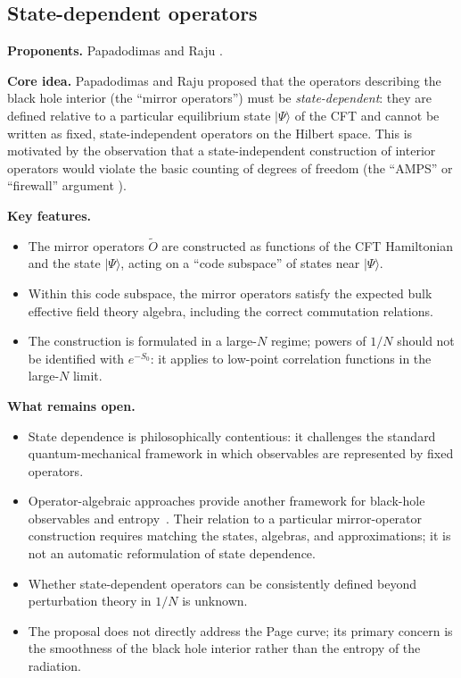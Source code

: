 \documentclass[11pt,letterpaper]{article}
\theoremstyle{plain}
\theoremstyle{definition}
\theoremstyle{remark}
\begin{document}
\subsection{State-dependent operators}
\label{app:state_dependent}

\textbf{Proponents.}  Papadodimas and Raju \cite{papadodimasraju2013}.

\medskip
\noindent
\textbf{Core idea.}  Papadodimas and Raju proposed that the operators
describing the black hole interior (the ``mirror operators'') must be
\emph{state-dependent}: they are defined relative to a particular equilibrium
state $|\Psi\rangle$ of the CFT and cannot be written as fixed, state-independent
operators on the Hilbert space.  This is motivated by the observation that a
state-independent construction of interior operators would violate the
basic counting of degrees of freedom (the ``AMPS'' or ``firewall'' argument
\cite{ampsetal2013}).

\medskip
\noindent
\textbf{Key features.}
\begin{itemize}
  \item The mirror operators $\tilde{O}$ are constructed as functions of the
    CFT Hamiltonian and the state $|\Psi\rangle$, acting on a ``code subspace''
    of states near $|\Psi\rangle$.
  \item Within this code subspace, the mirror operators satisfy the expected
    bulk effective field theory algebra, including the correct commutation
    relations.
  \item The construction is formulated in a large-$N$ regime; powers of $1/N$
    should not be identified with $e^{-S_0}$: it applies to low-point correlation functions in the
    large-$N$ limit.
\end{itemize}

\medskip
\noindent
\textbf{What remains open.}
\begin{itemize}
  \item State dependence is philosophically contentious: it challenges the
    standard quantum-mechanical framework in which observables are represented
    by fixed operators.
  \item Operator-algebraic approaches provide another framework for black-hole
    observables and entropy~\citep{witten2022}.  Their relation to a particular
    mirror-operator construction requires matching the states, algebras, and
    approximations; it is not an automatic reformulation of state dependence.
  \item Whether state-dependent operators can be consistently defined beyond
    perturbation theory in $1/N$ is unknown.
  \item The proposal does not directly address the Page curve; its primary
    concern is the smoothness of the black hole interior rather than the
    entropy of the radiation.
\end{itemize}
\end{document}
